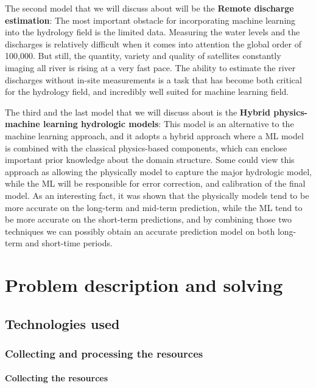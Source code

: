 \documentclass[12pt, a4paper]{report}
\begin{document}
The second model that we will discuss about will be the \textbf{Remote discharge estimation}: The most important obstacle for incorporating machine learning into the hydrology field is the limited data. Measuring the water levels and the discharges is relatively difficult when it comes into attention the global order of 100,000. But still, the quantity, variety and quality of satellites constantly imaging all river is rising at a very fast pace. The ability to estimate the river discharges without in-site measurements is a task that has become both critical for the hydrology field, and incredibly well suited for machine learning field.
\par 

The third and the last model that we will discuss about is the \textbf{Hybrid physics-machine learning hydrologic models}: This model is an alternative to the machine learning approach, and it adopts a hybrid approach where a ML model is combined with the classical physics-based components, which can enclose important prior knowledge about the domain structure. Some could view this approach as allowing the physically model to capture the major hydrologic  model, while the ML will be responsible for error correction, and calibration of the final model. As an interesting fact, it was shown that the physically models tend to be more accurate on the long-term and mid-term prediction, while the ML tend to be more accurate on the short-term predictions, and by combining those two techniques we can possibly obtain an accurate prediction model on both long-term and short-time periods.



\newpage{}


\chapter{Problem description and solving}

\section{Technologies used}

\subsection{Collecting and processing the resources}

\subsubsection{Collecting the resources}
\end{document}
